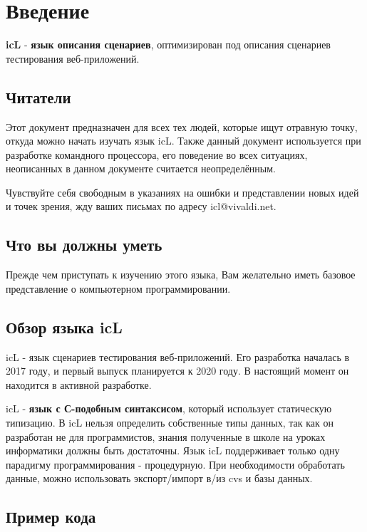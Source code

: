 \section{Введение}

\indent \textbf{icL} - \textbf{язык описания сценариев}, оптимизирован под описания сценариев тестирования веб-приложений.

\subsection{Читатели}

Этот документ предназначен для всех тех людей, которые ищут отравную точку, откуда можно начать изучать язык icL. Также данный документ используется при разработке командного процессора, его поведение  во всех ситуациях, неописанных в данном документе считается неопределённым.

Чувствуйте себя свободным в указаниях на ошибки и представлении новых идей и точек зрения, жду ваших письмах по адресу icl@vivaldi.net.

\subsection{Что вы должны уметь}

Прежде чем приступать к изучению этого языка, Вам желательно иметь базовое представление о компьютерном программировании.

\subsection{Обзор языка icL}

icL - язык сценариев тестирования веб-приложений. Его разработка началась в 2017 году, и первый выпуск планируется к 2020 году. В настоящий момент он находится в активной разработке.

icL - \textbf{язык с С-подобным синтаксисом}, который использует статическую типизацию. В icL нельзя определить собственные типы данных, так как он разработан не для программистов, знания полученные в школе на уроках информатики должны быть достаточны. Язык icL поддерживает только одну парадигму программирования - процедурную. При необходимости обработать данные, можно использовать экспорт/импорт в/из cvs и базы данных.

\subsection{Пример кода}

